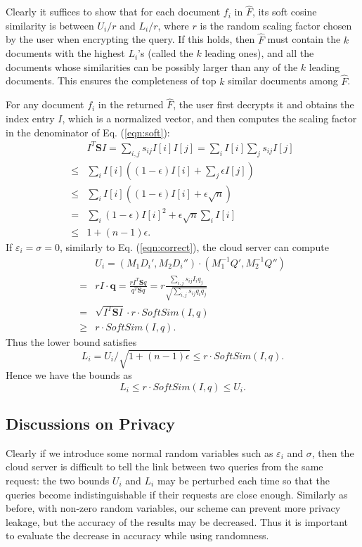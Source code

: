 \documentclass{IEEEtran}
\begin{document}
Clearly it suffices to show that for each document $f_i$ in $\hat{F}$, its soft cosine similarity is between $U_i/r$ and $L_i/r$, where $r$ is the random scaling factor chosen by the user when encrypting the query. If this holds, then $\hat{F}$ must contain the $k$ documents with the highest $L_i$'s (called the $k$ leading ones), and all the documents whose similarities can be possibly larger than any of the $k$ leading documents. This ensures the completeness of top $k$ similar documents among $\hat{F}$.

For any document $f_i$ in the returned $\hat{F}$, the user first decrypts it and obtains the index entry $I$, which is a normalized vector, and then computes the scaling factor in the denominator of Eq. (\ref{eqn:soft}):
$$\begin{aligned}
&I^T \mathbf{S} I = \sum_{i,j} s_{ij} I[i]I[j] 
=\sum_i I[i] \sum_j s_{ij} I[j] \\
\leq & \sum_i I[i] \left( (1-\epsilon)I[i] + \sum_j \epsilon I[j] \right) \\
\leq & \sum_i I[i] \left( (1-\epsilon)I[i] + \epsilon \sqrt{n} \right) \\
=& \sum_i (1-\epsilon)I[i]^2 + \epsilon \sqrt{n} \sum_i I[i] \\
\leq& 1+(n-1)\epsilon.
\end{aligned}$$
If $\varepsilon_i = \sigma = 0$, similarly to Eq. (\ref{eqn:correct}), the cloud server can compute 
$$\begin{aligned}
&U_i = (M_1D_i', M_2D_i'')\cdot(M_1^{-1}Q', M_2^{-1}Q'') \\
=&rI\cdot \mathbf{q} = \frac{rI^T\mathbf{S}q}{q^T\mathbf{S}q} 
=r\frac{\sum_{i,j}s_{ij}I_iq_j}{\sqrt{\sum_{i,j}s_{ij}q_iq_j}}\\
=&\sqrt{I^T \mathbf{S} I}\cdot r\cdot SoftSim(I,q)\\
\geq& r\cdot SoftSim(I,q).
\end{aligned}$$
Thus the lower bound satisfies
$$L_i = U_i/\sqrt{1+(n-1)\epsilon} \leq r\cdot SoftSim(I,q).$$
Hence we have the bounds as
$$L_i \leq r\cdot SoftSim(I,q)\leq U_i.$$

\subsection{Discussions on Privacy}
Clearly if we introduce some normal random variables such as $\varepsilon_i$ and $\sigma$, then the cloud server is difficult to tell the link between two queries from the same request: the two bounds $U_i$ and $L_i$ may be perturbed each time so that the queries become indistinguishable if their requests are close enough. Similarly as before, with non-zero random variables, our scheme can prevent more privacy leakage, but the accuracy of the results may be decreased. Thus it is important to evaluate the decrease in accuracy while using randomness.



\end{document}
